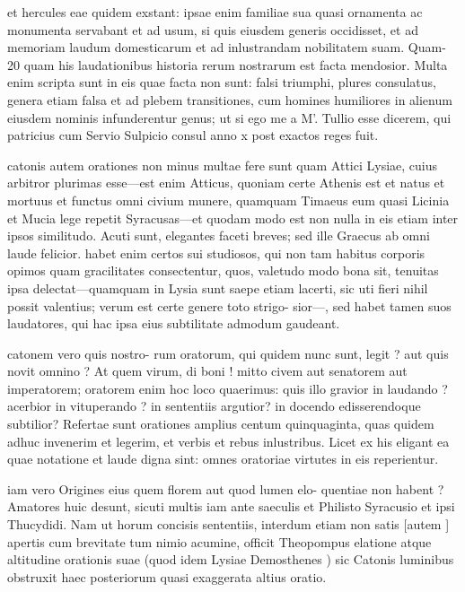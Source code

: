  et hercules eae quidem exstant: ipsae enim familiae sua quasi ornamenta ac monumenta servabant et ad usum, si quis eiusdem generis occidisset, et ad memoriam laudum domesticarum et ad inlustrandam nobilitatem suam. Quam- 20 quam his laudationibus historia rerum nostrarum est facta mendosior. Multa enim scripta sunt in eis quae facta non sunt: falsi triumphi, plures consulatus, genera etiam falsa et ad plebem transitiones, cum homines humiliores in alienum eiusdem nominis infunderentur genus; ut si ego me a M'. Tullio esse dicerem, qui patricius cum Servio Sulpicio consul anno x post exactos reges fuit.

 catonis autem orationes non minus multae fere sunt quam Attici Lysiae, cuius arbitror plurimas esse—est enim Atticus, quoniam certe Athenis est et natus et mortuus et functus omni civium munere, quamquam Timaeus eum quasi Licinia et Mucia lege repetit Syracusas—et quodam modo est non nulla in eis etiam inter ipsos similitudo. Acuti sunt, elegantes faceti breves; sed ille Graecus ab omni laude felicior. habet enim certos sui studiosos, qui non tam habitus corporis opimos quam gracilitates consectentur, quos, valetudo modo bona sit, tenuitas ipsa delectat—quamquam in Lysia sunt saepe etiam lacerti, sic uti fieri nihil possit valentius; verum est certe genere toto strigo- sior—, sed habet tamen suos laudatores, qui hac ipsa eius subtilitate admodum gaudeant.

 catonem vero quis nostro- rum oratorum, qui quidem nunc sunt, legit ? aut quis novit omnino ? At quem virum, di boni ! mitto civem aut senatorem aut imperatorem; oratorem enim hoc loco quaerimus: quis illo gravior in laudando ? acerbior in vituperando ? in sententiis argutior? in docendo edisserendoque subtilior? Refertae sunt orationes amplius centum quinquaginta, quas quidem adhuc invenerim et legerim, et verbis et rebus inlustribus. Licet ex his eligant ea quae notatione et laude digna sint: omnes oratoriae virtutes in eis reperientur.

 iam vero Origines eius quem florem aut quod lumen elo- quentiae non habent ? Amatores huic desunt, sicuti multis iam ante saeculis et Philisto Syracusio et ipsi Thucydidi. Nam ut horum concisis sententiis, interdum etiam non satis [autem ] apertis cum brevitate tum nimio acumine, officit Theopompus elatione atque altitudine orationis suae (quod idem Lysiae Demosthenes ) sic Catonis luminibus obstruxit haec posteriorum quasi exaggerata altius oratio.

